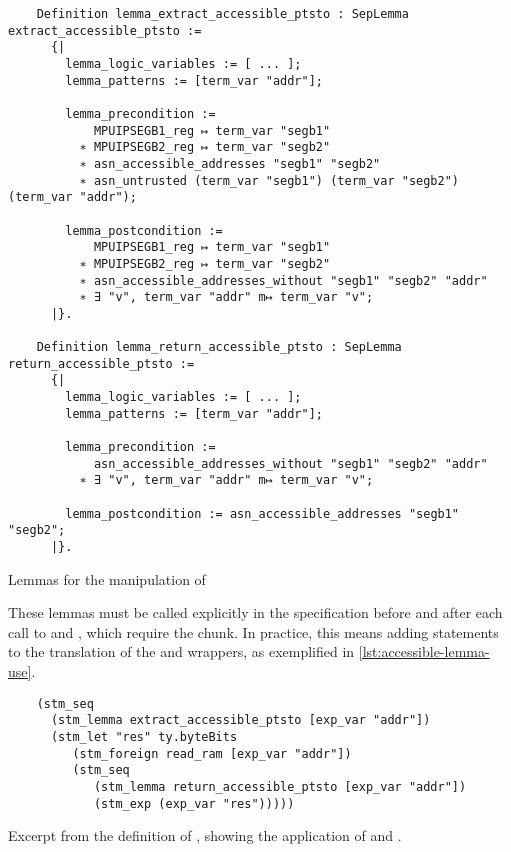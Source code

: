 \begin{listing}[htb]
  \begin{verbatim}
    Definition lemma_extract_accessible_ptsto : SepLemma extract_accessible_ptsto :=
      {|
        lemma_logic_variables := [ ... ];
        lemma_patterns := [term_var "addr"];

        lemma_precondition :=
            MPUIPSEGB1_reg ↦ term_var "segb1"
          ∗ MPUIPSEGB2_reg ↦ term_var "segb2"
          ∗ asn_accessible_addresses "segb1" "segb2"
          ∗ asn_untrusted (term_var "segb1") (term_var "segb2") (term_var "addr");

        lemma_postcondition :=
            MPUIPSEGB1_reg ↦ term_var "segb1"
          ∗ MPUIPSEGB2_reg ↦ term_var "segb2"
          ∗ asn_accessible_addresses_without "segb1" "segb2" "addr"
          ∗ ∃ "v", term_var "addr" m↦ term_var "v";
      |}.

    Definition lemma_return_accessible_ptsto : SepLemma return_accessible_ptsto :=
      {|
        lemma_logic_variables := [ ... ];
        lemma_patterns := [term_var "addr"];

        lemma_precondition :=
            asn_accessible_addresses_without "segb1" "segb2" "addr"
          ∗ ∃ "v", term_var "addr" m↦ term_var "v";

        lemma_postcondition := asn_accessible_addresses "segb1" "segb2";
      |}.
  \end{verbatim}
  \caption{Lemmas for the manipulation of }
  \label{lst:accessible-lemmas}
\end{listing}

These lemmas must be called explicitly in the \usail specification before and after each call to  and , which require the  chunk. In practice, this means adding  statements to the translation of the  and  wrappers, as exemplified in \cref{lst:accessible-lemma-use}.

\begin{listing}[htb]
  \begin{verbatim}
    (stm_seq
      (stm_lemma extract_accessible_ptsto [exp_var "addr"])
      (stm_let "res" ty.byteBits
         (stm_foreign read_ram [exp_var "addr"])
         (stm_seq
            (stm_lemma return_accessible_ptsto [exp_var "addr"])
            (stm_exp (exp_var "res")))))
  \end{verbatim}
  \caption{Excerpt from the \usail definition of , showing the application of  and .}
  \label{lst:accessible-lemma-use}
\end{listing}

